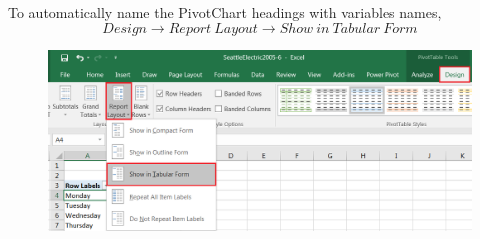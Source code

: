 \documentclass[12pt]{report}
\begin{document}
\vspace{-\baselineskip}
\noindent To automatically name the PivotChart headings with variables names,
$$Design \to Report\ Layout \to Show\ in\ Tabular\ Form$$
\begin{figure}[H]
	\centerline{\includegraphics{q1_11}}
\end{figure}
\vspace{-\baselineskip}
\end{document}
